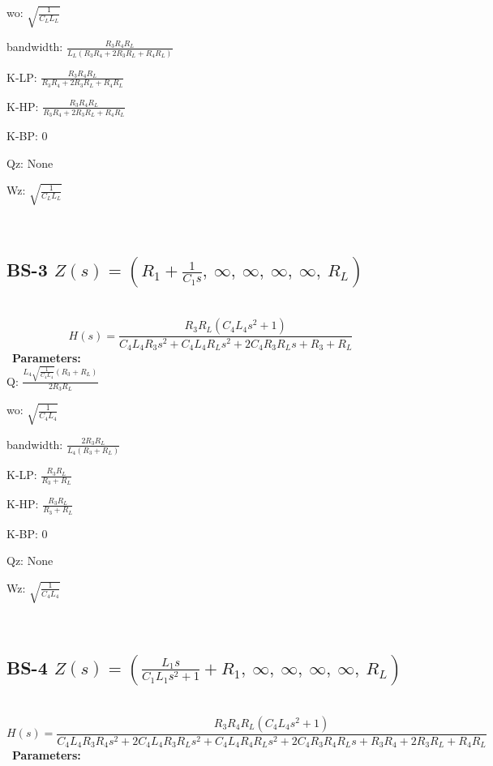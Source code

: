 \documentclass{article}
\begin{document}
wo: $\sqrt{\frac{1}{C_{L} L_{L}}}$\ 

bandwidth: $\frac{R_{3} R_{4} R_{L}}{L_{L} \left(R_{3} R_{4} + 2 R_{3} R_{L} + R_{4} R_{L}\right)}$\ 

K-LP: $\frac{R_{3} R_{4} R_{L}}{R_{3} R_{4} + 2 R_{3} R_{L} + R_{4} R_{L}}$\ 

K-HP: $\frac{R_{3} R_{4} R_{L}}{R_{3} R_{4} + 2 R_{3} R_{L} + R_{4} R_{L}}$\ 

K-BP: $0$\ 

Qz: $\text{None}$\ 

Wz: $\sqrt{\frac{1}{C_{L} L_{L}}}$\ 

\ 

\subsection{BS-3 $Z(s) = \left( R_{1} + \frac{1}{C_{1} s}, \  \infty, \  \infty, \  \infty, \  \infty, \  R_{L}\right)$ } \ 
\textbf{\[H(s) = \frac{R_{3} R_{L} \left(C_{4} L_{4} s^{2} + 1\right)}{C_{4} L_{4} R_{3} s^{2} + C_{4} L_{4} R_{L} s^{2} + 2 C_{4} R_{3} R_{L} s + R_{3} + R_{L}}\] } \ 
\textbf{Parameters:}\\ 

Q: $\frac{L_{4} \sqrt{\frac{1}{C_{4} L_{4}}} \left(R_{3} + R_{L}\right)}{2 R_{3} R_{L}}$\ 

wo: $\sqrt{\frac{1}{C_{4} L_{4}}}$\ 

bandwidth: $\frac{2 R_{3} R_{L}}{L_{4} \left(R_{3} + R_{L}\right)}$\ 

K-LP: $\frac{R_{3} R_{L}}{R_{3} + R_{L}}$\ 

K-HP: $\frac{R_{3} R_{L}}{R_{3} + R_{L}}$\ 

K-BP: $0$\ 

Qz: $\text{None}$\ 

Wz: $\sqrt{\frac{1}{C_{4} L_{4}}}$\ 

\ 

\subsection{BS-4 $Z(s) = \left( \frac{L_{1} s}{C_{1} L_{1} s^{2} + 1} + R_{1}, \  \infty, \  \infty, \  \infty, \  \infty, \  R_{L}\right)$ } \ 
\textbf{\[H(s) = \frac{R_{3} R_{4} R_{L} \left(C_{4} L_{4} s^{2} + 1\right)}{C_{4} L_{4} R_{3} R_{4} s^{2} + 2 C_{4} L_{4} R_{3} R_{L} s^{2} + C_{4} L_{4} R_{4} R_{L} s^{2} + 2 C_{4} R_{3} R_{4} R_{L} s + R_{3} R_{4} + 2 R_{3} R_{L} + R_{4} R_{L}}\] } \ 
\textbf{Parameters:}\\ 
\end{document}
